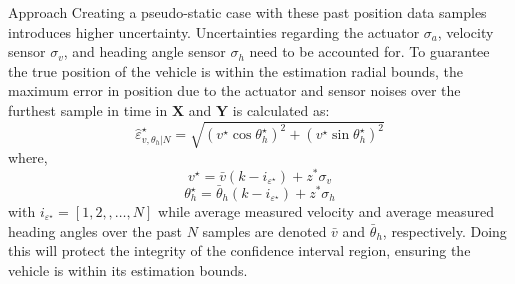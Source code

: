 \begin{section}{Approach}
Creating a pseudo-static case with these past position data samples introduces higher uncertainty. Uncertainties regarding the actuator $\sigma_a$, velocity sensor $\sigma_v$, and heading angle sensor $\sigma_h$ need to be accounted for. To guarantee the true position of the vehicle is within the estimation radial bounds, the maximum error in position due to the actuator and sensor noises over the furthest sample in time in $\mathcal{\bm{X}}$ and $\mathcal{\bm{Y}}$ is calculated as:
    \begin{equation}
	\hat{\varepsilon}_{v,\theta_h|N}^{\star}=\sqrt{(v^{\star}\cos{\theta_h^{\star}})^2+(v^{\star}\sin{\theta_h^{\star}})^2}
	\end{equation}
where,
    \begin{equation}
	v^{\star}=\bar{v}(k-i_{\varepsilon^{\star}})+z^{*}\sigma_v \nonumber
	\end{equation}
	\begin{equation}
	\theta_h^{\star}=\bar{\theta}_h(k-i_{\varepsilon^{\star}})+z^{*}\sigma_h \nonumber
	\end{equation}
with $i_{\varepsilon^{\star}}=[1,2,,\dots,N]$ while average measured velocity and average measured heading angles over the past $N$ samples are denoted $\bar{v}$ and $\bar{\theta}_h$, respectively. Doing this will protect the integrity of the confidence interval region, ensuring the vehicle is within its estimation bounds.


\end{section}
